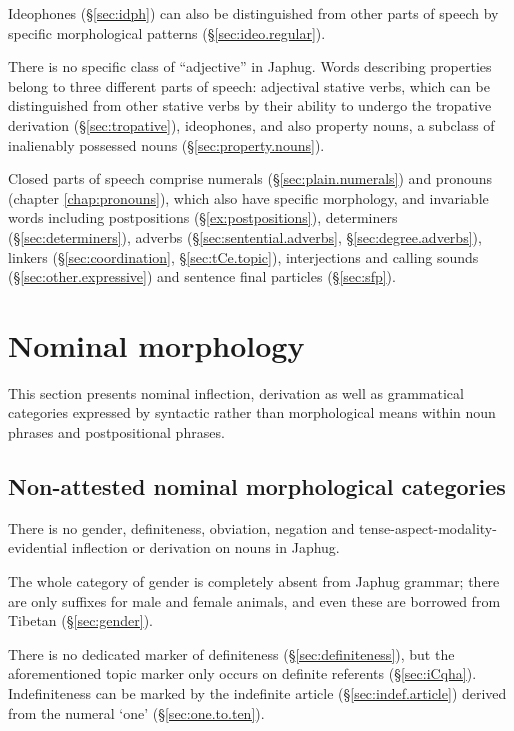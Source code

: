Ideophones (§\ref{sec:idph}) can also be distinguished from other parts of speech by specific morphological patterns (§\ref{sec:ideo.regular}).

There is no specific class of ``adjective'' in Japhug. Words describing properties belong to three different parts of speech: adjectival stative verbs, which can be distinguished from other stative verbs by their ability to undergo the tropative derivation (§\ref{sec:tropative}), ideophones, and also property nouns, a subclass of inalienably possessed nouns (§\ref{sec:property.nouns}).

Closed parts of speech comprise numerals (§\ref{sec:plain.numerals}) and pronouns (chapter \ref{chap:pronouns}), which also have specific morphology, and invariable words including postpositions (§\ref{ex:postpositions}), determiners (§\ref{sec:determiners}), adverbs (§\ref{sec:sentential.adverbs}, §\ref{sec:degree.adverbs}), linkers (§\ref{sec:coordination}, §\ref{sec:tCe.topic}), interjections and calling sounds (§\ref{sec:other.expressive}) and sentence final particles (§\ref{sec:sfp}). 

\section{Nominal morphology} \label{sec:noun.introduction}
This section presents nominal inflection, derivation as well as grammatical categories expressed by syntactic rather than morphological means within noun phrases and postpositional phrases.

\subsection{Non-attested nominal morphological categories}
There is no gender, definiteness, obviation, negation and tense-aspect-modality-evidential inflection or derivation on nouns in Japhug. 

The whole category of gender is completely absent from Japhug grammar; there are only suffixes for male and female animals, and even these are borrowed from Tibetan (§\ref{sec:gender}). 

There is no dedicated marker of definiteness (§\ref{sec:definiteness}), but the aforementioned topic marker  only occurs on definite referents (§\ref{sec:iCqha}). Indefiniteness can be marked by the indefinite article  (§\ref{sec:indef.article}) derived from the numeral `one' (§\ref{sec:one.to.ten}). 


